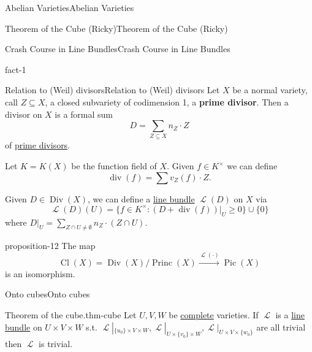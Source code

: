 \documentclass[10pt,]{book}
\newcommand{\terminology}[1]{\textbf{#1}}
\numberwithin{equation}{section}
\newcommand{\sheaf}[1]{\operatorname{\mathcal{#1}}}
\DeclareMathOperator{\divisor}{div}
\DeclareMathOperator{\Cl}{Cl}
\DeclareMathOperator{\Div}{Div}
\DeclareMathOperator{\Pic}{Pic}
\DeclareMathOperator{\Princ}{Princ}
\begin{document}
\begin{chapterptx}{Abelian Varieties}{}{Abelian Varieties}{}{}
\begin{sectionptx}{Theorem of the Cube (Ricky)}{}{Theorem of the Cube (Ricky)}{}{}
\begin{subsectionptx}{Crash Course in Line Bundles}{}{Crash Course in Line Bundles}{}{}
\begin{fact}{}{}{fact-1}
\end{fact}
\end{subsectionptx}
%
%
\typeout{************************************************}
\typeout{************************************************}
%
\begin{subsectionptx}{Relation to (Weil) divisors}{}{Relation to (Weil) divisors}{}{}\label{sec-reln-weil}
\hypertarget{p-118}{}%
Let \(X\) be a normal variety, call \(Z\subseteq X\), a closed subvariety of codimension 1, a \terminology{prime divisor}. Then a divisor on \(X\) is a formal sum%
\begin{equation*}
D = \sum_{Z\subseteq X} n_Z\cdot Z
\end{equation*}
of \hyperref[sec-reln-weil]{prime divisors}.%
\par
\hypertarget{p-119}{}%
Let \(K = K(X)\) be the function field of \(X\). Given \(f\in K^\times\) we can define%
\begin{equation*}
\divisor (f) = \sum v_Z(f) \cdot Z\text{.}
\end{equation*}
%
\par
\hypertarget{p-120}{}%
Given \(D \in \Div(X)\), we can define a \hyperref[def-line-bundle]{line bundle} \(\sheaf L(D)\) on \(X\) via%
\begin{equation*}
\sheaf L(D)(U) = \{f\in K^\times : (D + \divisor (f))|_U\ge 0 \} \cup \{0\}
\end{equation*}
where \(D|_U = \sum_{Z\cap U\ne \emptyset} n_Z\cdot (Z\cap U)\).%
\begin{proposition}{}{}{proposition-12}%
\hypertarget{p-121}{}%
The map%
\begin{equation*}
\Cl(X) = \Div(X)/\Princ(X) \xrightarrow{\sheaf L(\cdot)} \Pic(X)
\end{equation*}
is an isomorphism.%
\end{proposition}
\end{subsectionptx}
%
%
\typeout{************************************************}
\typeout{************************************************}
%
\begin{subsectionptx}{Onto cubes}{}{Onto cubes}{}{}\label{sec-onto-cubes}
\begin{theorem}{Theorem of the cube.}{}{thm-cube}%
\hypertarget{p-122}{}%
Let \(U,V,W\) be \hyperref[def-abelian-complete-var]{complete} varieties. If \(\sheaf L \) is a \hyperref[def-line-bundle]{line bundle} on \(U\times V\times W\) s.t. \(\sheaf L|_{\{u_0\}\times V\times W},\sheaf L|_{U\times \{v_0\}\times W}, \sheaf L|_{U\times V\times \{w_0\}}\) are all trivial then \(\sheaf L\) is trivial.%

\end{theorem}
\end{subsectionptx}
\end{sectionptx}
\end{chapterptx}
\end{document}
